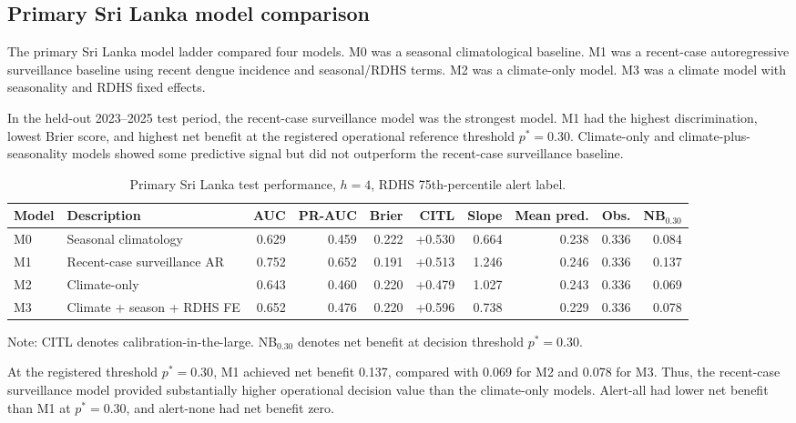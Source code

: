 \documentclass[11pt,a4paper]{article}
\begin{document}
\subsection{Primary Sri Lanka model comparison}
\label{subsec:primary-srilanka}

The primary Sri Lanka model ladder compared four models. M0 was a seasonal climatological baseline. M1 was a recent-case autoregressive surveillance baseline using recent dengue incidence and seasonal/RDHS terms. M2 was a climate-only model. M3 was a climate model with seasonality and RDHS fixed effects.

In the held-out 2023--2025 test period, the recent-case surveillance model was the strongest model. M1 had the highest discrimination, lowest Brier score, and highest net benefit at the registered operational reference threshold $p^*=0.30$. Climate-only and climate-plus-seasonality models showed some predictive signal but did not outperform the recent-case surveillance baseline.

\begin{table}[htbp]
\centering
\caption{Primary Sri Lanka test performance, $h=4$, RDHS 75th-percentile alert label.}
\label{tab:srilanka-primary-performance}
\begin{threeparttable}
\small
\begin{tabular}{llrrrrrrrr}
\toprule
Model & Description & AUC & PR-AUC & Brier & CITL & Slope & Mean pred. & Obs. & NB$_{0.30}$ \\
\midrule
M0 & Seasonal climatology & 0.629 & 0.459 & 0.222 & +0.530 & 0.664 & 0.238 & 0.336 & 0.084 \\
M1 & Recent-case surveillance AR & 0.752 & 0.652 & 0.191 & +0.513 & 1.246 & 0.246 & 0.336 & 0.137 \\
M2 & Climate-only & 0.643 & 0.460 & 0.220 & +0.479 & 1.027 & 0.243 & 0.336 & 0.069 \\
M3 & Climate + season + RDHS FE & 0.652 & 0.476 & 0.220 & +0.596 & 0.738 & 0.229 & 0.336 & 0.078 \\
\bottomrule
\end{tabular}
\begin{tablenotes}
\footnotesize
\item Note: CITL denotes calibration-in-the-large. NB$_{0.30}$ denotes net benefit at decision threshold $p^*=0.30$.
\end{tablenotes}
\end{threeparttable}
\end{table}

At the registered threshold $p^*=0.30$, M1 achieved net benefit 0.137, compared with 0.069 for M2 and 0.078 for M3. Thus, the recent-case surveillance model provided substantially higher operational decision value than the climate-only models. Alert-all had lower net benefit than M1 at $p^*=0.30$, and alert-none had net benefit zero.
\end{document}
